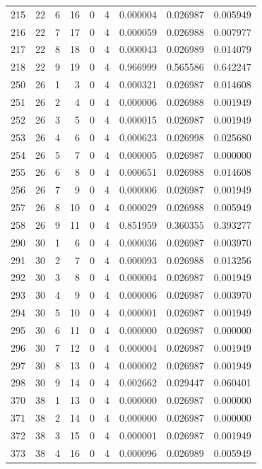 \begin{longtable}{rrrrrrrrr}
215 & 22 & 6 & 16 & 0 & 4 & 0.000004 & 0.026987 & 0.005949 \\
216 & 22 & 7 & 17 & 0 & 4 & 0.000059 & 0.026988 & 0.007977 \\
217 & 22 & 8 & 18 & 0 & 4 & 0.000043 & 0.026989 & 0.014079 \\
218 & 22 & 9 & 19 & 0 & 4 & 0.966999 & 0.565586 & 0.642247 \\
250 & 26 & 1 & 3 & 0 & 4 & 0.000321 & 0.026987 & 0.014608 \\
251 & 26 & 2 & 4 & 0 & 4 & 0.000006 & 0.026988 & 0.001949 \\
252 & 26 & 3 & 5 & 0 & 4 & 0.000015 & 0.026987 & 0.001949 \\
253 & 26 & 4 & 6 & 0 & 4 & 0.000623 & 0.026998 & 0.025680 \\
254 & 26 & 5 & 7 & 0 & 4 & 0.000005 & 0.026987 & 0.000000 \\
255 & 26 & 6 & 8 & 0 & 4 & 0.000651 & 0.026988 & 0.014608 \\
256 & 26 & 7 & 9 & 0 & 4 & 0.000006 & 0.026987 & 0.001949 \\
257 & 26 & 8 & 10 & 0 & 4 & 0.000029 & 0.026988 & 0.005949 \\
258 & 26 & 9 & 11 & 0 & 4 & 0.851959 & 0.360355 & 0.393277 \\
290 & 30 & 1 & 6 & 0 & 4 & 0.000036 & 0.026987 & 0.003970 \\
291 & 30 & 2 & 7 & 0 & 4 & 0.000093 & 0.026988 & 0.013256 \\
292 & 30 & 3 & 8 & 0 & 4 & 0.000004 & 0.026987 & 0.001949 \\
293 & 30 & 4 & 9 & 0 & 4 & 0.000006 & 0.026987 & 0.003970 \\
294 & 30 & 5 & 10 & 0 & 4 & 0.000001 & 0.026987 & 0.001949 \\
295 & 30 & 6 & 11 & 0 & 4 & 0.000000 & 0.026987 & 0.000000 \\
296 & 30 & 7 & 12 & 0 & 4 & 0.000004 & 0.026987 & 0.001949 \\
297 & 30 & 8 & 13 & 0 & 4 & 0.000002 & 0.026987 & 0.001949 \\
298 & 30 & 9 & 14 & 0 & 4 & 0.002662 & 0.029447 & 0.060401 \\
370 & 38 & 1 & 13 & 0 & 4 & 0.000000 & 0.026987 & 0.000000 \\
371 & 38 & 2 & 14 & 0 & 4 & 0.000000 & 0.026987 & 0.000000 \\
372 & 38 & 3 & 15 & 0 & 4 & 0.000001 & 0.026987 & 0.001949 \\
373 & 38 & 4 & 16 & 0 & 4 & 0.000096 & 0.026989 & 0.005949 \\

\end{longtable}
